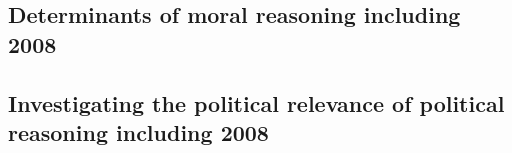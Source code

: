 \documentclass[12pt]{article}
\begin{document}
\subsection{Determinants of moral reasoning including 2008}








\subsection{Investigating the political relevance of political reasoning including 2008}





\end{document}
